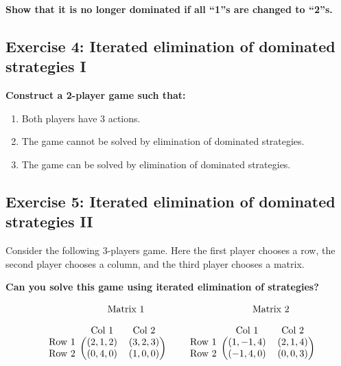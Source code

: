 \documentclass[10pt]{article}
\begin{document}
\textbf{Show that it is no longer dominated if all ``1''s are changed to ``2''s.}

\subsection*{Exercise 4: Iterated elimination of dominated strategies I}

\textbf{Construct a 2-player game such that:}

\begin{enumerate}
    \item Both players have 3 actions.
    \item The game cannot be solved by elimination of dominated strategies.
    \item The game can be solved by elimination of dominated strategies.
\end{enumerate}

\subsection*{Exercise 5: Iterated elimination of dominated strategies II}
Consider the following 3-players game. Here the first player chooses a row,
the second player chooses a column, and the third player chooses a matrix.

\textbf{Can you solve this game using iterated elimination of strategies?}

\begin{equation*}
\begin{blockarray}{ccc}
    & \BAmulticolumn{2}{c}{\text{Matrix } 1} \\ [1em]
    & \text{Col } 1 & \text{Col } 2 \\
    \begin{block}{c(cc)}
        \text{Row } 1 & (2, 1, 2) & (3, 2, 3) \\
        \text{Row } 2 & (0, 4, 0) & (1, 0, 0) \\
    \end{block}
\end{blockarray}\qquad
%
\begin{blockarray}{ccc}
    & \BAmulticolumn{2}{c}{\text{Matrix } 2} \\ [1em]
    & \text{Col } 1 & \text{Col } 2 \\
    \begin{block}{c(cc)}
        \text{Row } 1 & (1, -1, 4) & (2, 1, 4) \\
        \text{Row } 2 & (-1, 4, 0) & (0, 0, 3) \\
    \end{block}
\end{blockarray}
\end{equation*}
\end{document}
